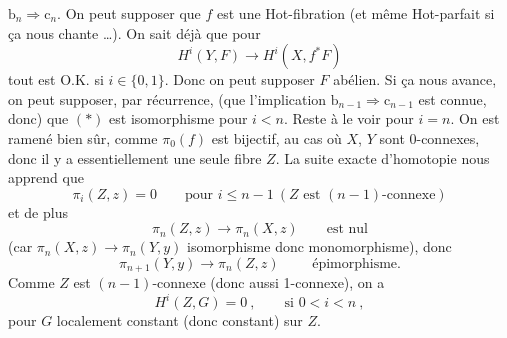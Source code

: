 $\mathrm{b}_n \Longrightarrow \mathrm{c}_n$. On peut supposer que $f$ est une Hot-fibration (et même Hot-parfait si ça nous chante \dots). On sait déjà que pour
\[
H^i(Y,F) \longrightarrow H^i(X,f^*F) \tag*{$(*)$}
\]
tout est O.K. si $i \in \{0,1\}$. Donc on peut supposer $F$ abélien. Si ça nous avance, on peut supposer, par récurrence, (que l’implication $\mathrm{b}_{n-1} \Longrightarrow \mathrm{c}_{n-1}$ est connue, donc) que $(*)$ est isomorphisme pour $i<n$. Reste à le voir pour $i=n$. On est ramené bien sûr, comme $\pi_0(f)$ est bijectif, au cas où $X$, $Y$ sont 0-connexes, donc il y a essentiellement une seule fibre $Z$. La suite exacte d’homotopie nous apprend que
\[
\pi_i(Z,z)=0 \qquad \text{pour } i \le n-1 \ (Z \text{ est } (n-1)\text{-connexe})
\]
et de plus
\[
\pi_n(Z,z) \longrightarrow \pi_n(X,z) \qquad \text{est nul}
\]
(car $\pi_n(X,z) \longrightarrow \pi_n(Y,y)$ isomorphisme donc monomorphisme), donc
\[
\pi_{n+1}(Y,y) \longrightarrow \pi_n(Z,z) \qquad \text{ épimorphisme.}
\]
Comme $Z$ est $(n-1)$-connexe (donc aussi 1-connexe), on a
\[
H^i(Z,G)=0\ , \qquad \text{si } 0<i<n\ , \tag*{$(*)$}
\]
pour $G$ localement constant (donc constant) sur $Z$.

